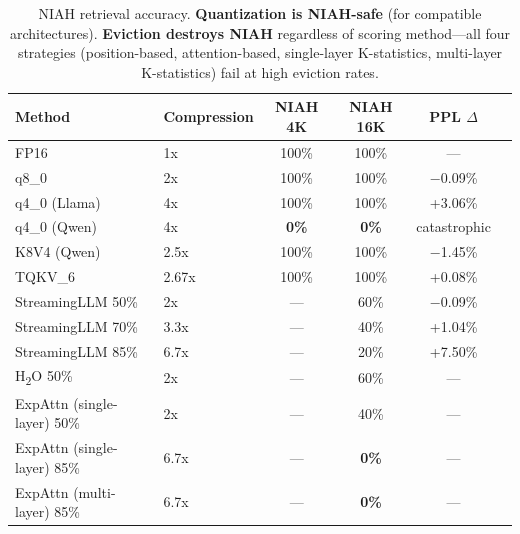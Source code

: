 \begin{table}[h]
\centering
\small
\begin{tabular}{llcccc}
\toprule
\textbf{Method} & \textbf{Compression} & \textbf{NIAH 4K} & \textbf{NIAH 16K} & \textbf{PPL $\Delta$} \\
\midrule
FP16 & 1x & 100\% & 100\% & --- \\
q8\_0 & 2x & 100\% & 100\% & $-$0.09\% \\
q4\_0 (Llama) & 4x & 100\% & 100\% & +3.06\% \\
q4\_0 (Qwen) & 4x & \textbf{0\%} & \textbf{0\%} & catastrophic \\
K8V4 (Qwen) & 2.5x & 100\% & 100\% & $-$1.45\% \\
TQKV\_6 & 2.67x & 100\% & 100\% & +0.08\% \\
\midrule
StreamingLLM 50\% & 2x & --- & 60\% & $-$0.09\% \\
StreamingLLM 70\% & 3.3x & --- & 40\% & +1.04\% \\
StreamingLLM 85\% & 6.7x & --- & 20\% & +7.50\% \\
H\textsubscript{2}O 50\% & 2x & --- & 60\% & --- \\
\midrule
ExpAttn (single-layer) 50\% & 2x & --- & 40\% & --- \\
ExpAttn (single-layer) 85\% & 6.7x & --- & \textbf{0\%} & --- \\
ExpAttn (multi-layer) 85\% & 6.7x & --- & \textbf{0\%} & --- \\
\bottomrule
\end{tabular}
\caption{NIAH retrieval accuracy. \textbf{Quantization is NIAH-safe} (for compatible architectures). \textbf{Eviction destroys NIAH} regardless of scoring method---all four strategies (position-based, attention-based, single-layer K-statistics, multi-layer K-statistics) fail at high eviction rates.}
\label{tab:niah-matrix}
\end{table}

